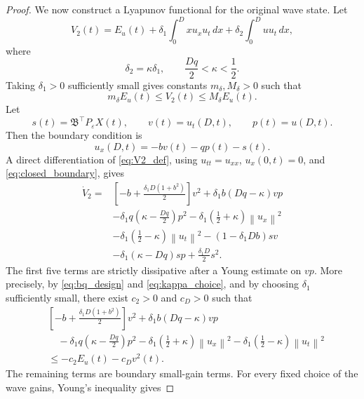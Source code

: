 \documentclass[journal]{IEEEtran}
\newcommand{\eps}{\varepsilon}
\newcommand{\Bcal}{\mathfrak B}
\newcommand{\norm}[1]{\left\|#1\right\|}
\begin{document}
\begin{proof}
We now construct a Lyapunov functional for the original wave state. Let
\begin{equation}
 V_2(t)=E_u(t)+\delta_1\int_0^D xu_xu_t\,dx
 +\delta_2\int_0^D uu_t\,dx,\label{eq:V2_def}
\end{equation}
where
\begin{equation}
 \delta_2=\kappa\delta_1,
 \qquad \frac{Dq}{2}<\kappa<\frac12.\label{eq:kappa_choice}
\end{equation}
Taking $\delta_1>0$ sufficiently small gives constants $m_\delta,M_\delta>0$ such that
\begin{equation}
 m_\delta E_u(t)\le V_2(t)\le M_\delta E_u(t).\label{eq:V2_equiv}
\end{equation}
Let
\begin{equation}
 s(t)=\Bcal^\top P_\eps X(t),
 \qquad v(t)=u_t(D,t),
 \qquad p(t)=u(D,t).
\end{equation}
Then the boundary condition is
\begin{equation}
 u_x(D,t)=-bv(t)-qp(t)-s(t).\label{eq:closed_boundary}
\end{equation}
A direct differentiation of \eqref{eq:V2_def}, using $u_{tt}=u_{xx}$, $u_x(0,t)=0$, and \eqref{eq:closed_boundary}, gives
\begin{align}
 \dot V_2
=&\left[-b+\frac{\delta_1D(1+b^2)}2\right]v^2
 +\delta_1b(Dq-\kappa)vp\nonumber\\
&-\delta_1q\left(\kappa-\frac{Dq}{2}\right)p^2
 -\delta_1\left(\frac12+\kappa\right)\norm{u_x}^2\nonumber\\
&-\delta_1\left(\frac12-\kappa\right)\norm{u_t}^2
 -(1-\delta_1Db)sv\nonumber\\
&-\delta_1(\kappa-Dq)sp+\frac{\delta_1D}{2}s^2.
\label{eq:V2dot_raw}
\end{align}
The first five terms are strictly dissipative after a Young estimate on $vp$. More precisely, by \eqref{eq:bq_design} and \eqref{eq:kappa_choice}, and by choosing $\delta_1$ sufficiently small, there exist $c_2>0$ and $c_D>0$ such that
\begin{align}
&\left[-b+\frac{\delta_1D(1+b^2)}2\right]v^2
 +\delta_1b(Dq-\kappa)vp\nonumber\\
&\quad -\delta_1q\left(\kappa-\frac{Dq}{2}\right)p^2
 -\delta_1\left(\frac12+\kappa\right)\norm{u_x}^2
 -\delta_1\left(\frac12-\kappa\right)\norm{u_t}^2
\nonumber\\
&\le -c_2E_u(t)-c_Dv^2(t).\label{eq:pure_wave_diss}
\end{align}
The remaining terms are boundary small-gain terms. For every fixed choice of the wave gains, Young's inequality gives

\end{proof}
\end{document}
